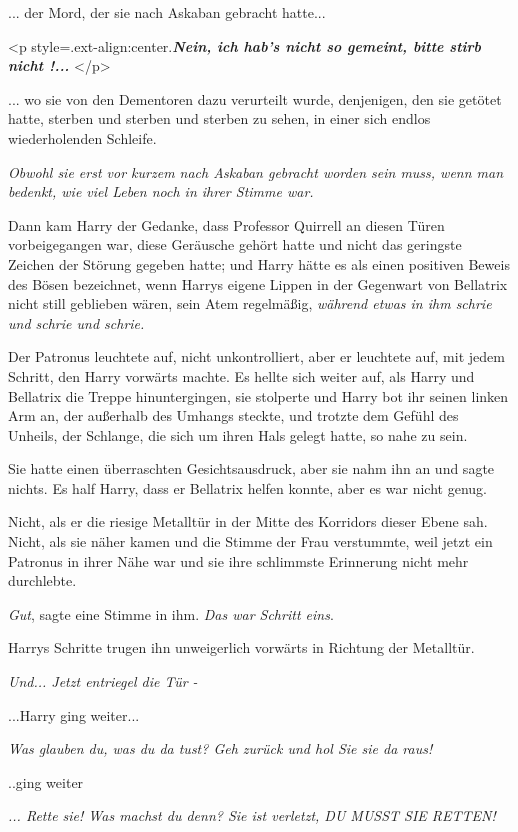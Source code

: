 ... der Mord, der sie nach Askaban gebracht hatte...

<p style=\grqq{}.ext-align:center\grqq{}.\textbf{\emph{\glqq Nein, ich hab's
nicht so gemeint, bitte stirb nicht !...\grqq{} }}</p>

... wo sie von den Dementoren dazu verurteilt wurde, denjenigen, den sie getötet
hatte, sterben und sterben und sterben zu sehen, in einer sich endlos
wiederholenden Schleife.

\emph{Obwohl sie erst vor kurzem nach Askaban gebracht worden sein muss, wenn man bedenkt, wie viel Leben noch in ihrer Stimme war.}

Dann kam Harry der Gedanke, dass Professor Quirrell an diesen Türen
vorbeigegangen war, diese Geräusche gehört hatte und nicht das geringste Zeichen
der Störung gegeben hatte; und Harry hätte es als einen positiven Beweis des
Bösen bezeichnet, wenn Harrys eigene Lippen in der Gegenwart von Bellatrix nicht
still geblieben wären, sein Atem regelmäßig, \emph{während etwas in ihm schrie
und schrie und schrie.}

Der Patronus leuchtete auf, nicht unkontrolliert, aber er leuchtete auf, mit
jedem Schritt, den Harry vorwärts machte. Es hellte sich weiter auf, als Harry
und Bellatrix die Treppe hinuntergingen, sie stolperte und Harry bot ihr seinen
linken Arm an, der außerhalb des Umhangs steckte, und trotzte dem Gefühl des
Unheils, der Schlange, die sich um ihren Hals gelegt hatte, so nahe zu sein.

Sie hatte einen überraschten Gesichtsausdruck, aber sie nahm ihn an und sagte
nichts. Es half Harry, dass er Bellatrix helfen konnte, aber es war nicht genug.

Nicht, als er die riesige Metalltür in der Mitte des Korridors dieser Ebene sah.
Nicht, als sie näher kamen und die Stimme der Frau verstummte, weil jetzt ein
Patronus in ihrer Nähe war und sie ihre schlimmste Erinnerung nicht mehr
durchlebte.

\emph{Gut}, sagte eine Stimme in ihm. \emph{Das war Schritt eins}.

Harrys Schritte trugen ihn unweigerlich vorwärts in Richtung der Metalltür.

\emph{Und... Jetzt entriegel die Tür - }

...Harry ging weiter...

\emph{Was glauben du, was du da tust? Geh zurück und hol Sie sie da raus!}

..ging weiter

\emph{... Rette sie! Was machst du denn? Sie ist verletzt, DU MUSST SIE RETTEN! }

